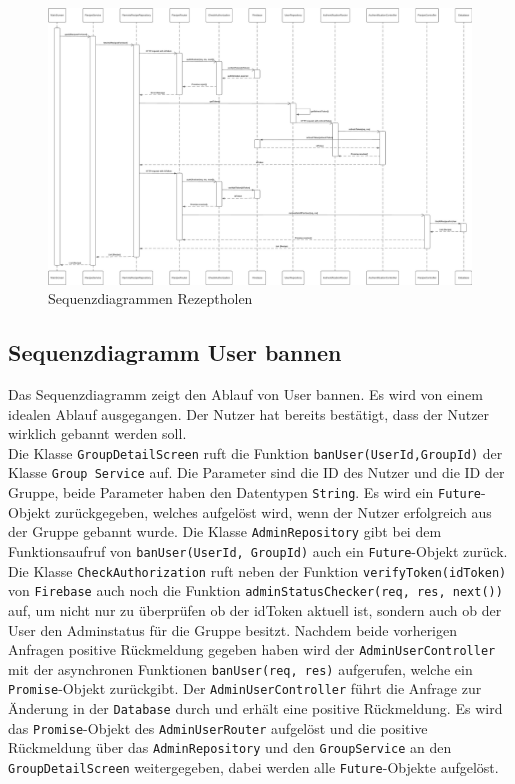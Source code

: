 \documentclass{entwurfsheft}
\begin{document}
        \begin{figure}[htp]
            \centering
            \includegraphics[width = \linewidth]{images/processDescription/SequenzdiagrammRecipeFetching.pdf}
            \caption{Sequenzdiagrammen Rezeptholen}
        \end{figure}

    \newpage
    
    \subsection{Sequenzdiagramm User bannen}
         Das Sequenzdiagramm zeigt den Ablauf von User bannen. Es wird von einem idealen Ablauf ausgegangen. Der Nutzer hat bereits bestätigt, dass der Nutzer wirklich gebannt werden soll.\\
        Die Klasse \texttt{GroupDetailScreen} ruft die Funktion \texttt{banUser(UserId,GroupId)} der Klasse \texttt{Group Service} auf. Die Parameter sind die ID des Nutzer und die ID der Gruppe, beide Parameter haben den Datentypen \texttt{String}. Es wird ein \texttt{Future}-Objekt zurückgegeben, welches aufgelöst wird, wenn der Nutzer erfolgreich aus der Gruppe gebannt wurde. Die Klasse \texttt{AdminRepository} gibt bei dem Funktionsaufruf von \texttt{banUser(UserId, GroupId)} auch ein \texttt{Future}-Objekt zurück. Die Klasse \texttt{CheckAuthorization} ruft neben der Funktion \texttt{verifyToken(idToken)} von \texttt{Firebase} auch noch die Funktion \texttt{adminStatusChecker(req, res, next())} auf, um nicht nur zu überprüfen ob der idToken aktuell ist, sondern auch ob der User den Adminstatus für die Gruppe besitzt. Nachdem beide vorherigen Anfragen positive Rückmeldung gegeben haben wird der \texttt{AdminUserController} mit der asynchronen Funktionen \texttt{banUser(req, res)} aufgerufen, welche ein \texttt{Promise}-Objekt zurückgibt. Der \texttt{AdminUserController} führt die Anfrage zur Änderung in der \texttt{Database} durch und erhält eine positive Rückmeldung. Es wird das \texttt{Promise}-Objekt des \texttt{AdminUserRouter} aufgelöst und die positive Rückmeldung über das \texttt{AdminRepository} und den \texttt{GroupService} an den \texttt{GroupDetailScreen} weitergegeben, dabei werden alle \texttt{Future}-Objekte aufgelöst.
\end{document}

